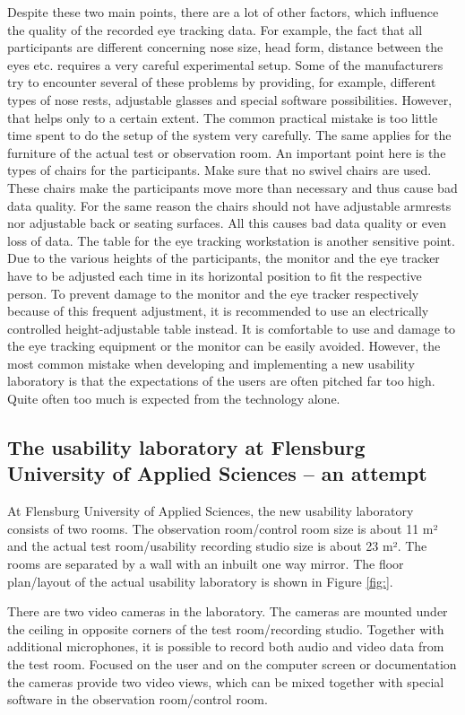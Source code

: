 \documentclass[output=paper]{langsci/langscibook}
\begin{document}
Despite these two main points, there are a lot of other factors, which influence the quality of the recorded eye tracking data. For example, the fact that all participants are different concerning nose size, head form, distance between the eyes etc. requires a very careful experimental setup. Some of the manufacturers try to encounter several of these problems by providing, for example, different types of nose rests, adjustable glasses and special software possibilities. However, that helps only to a certain extent. The common practical mistake is too little time spent to do the setup of the system very carefully. The same applies for the furniture of the actual test or observation room. An important point here is the types of chairs for the participants. Make sure that no swivel chairs are used. These chairs make the participants move more than necessary and thus cause bad data quality. For the same reason the chairs should not have adjustable armrests nor adjustable back or seating surfaces. All this causes bad data quality or even loss of data. The table for the eye tracking workstation is another sensitive point. Due to the various heights of the participants, the monitor and the eye tracker have to be adjusted each time in its horizontal position to fit the respective person. To prevent damage to the monitor and the eye tracker respectively because of this frequent adjustment, it is recommended to use an electrically controlled height-adjustable table instead. It is comfortable to use and damage to the eye tracking equipment or the monitor can be easily avoided. However, the most common mistake when developing and implementing a new usability laboratory is that the expectations of the users are often pitched far too high. Quite often too much is expected from the technology alone. 


\subsection{The usability laboratory at Flensburg University of Applied Sciences – an attempt }

At Flensburg University of Applied Sciences, the new usability laboratory consists of two rooms. The observation room/control room size is about 11 m² and the actual test room/usability recording studio size is about 23 m². The rooms are separated by a wall with an inbuilt one way mirror. The floor plan/layout of the actual usability laboratory is shown in Figure \ref{fig:}. 


There are two video cameras in the laboratory. The cameras are mounted under the ceiling in opposite corners of the test room/recording studio. Together with additional microphones, it is possible to record both audio and video data from the test room. Focused on the user and on the computer screen or documentation the cameras provide two video views, which can be mixed together with special software in the observation room/control room. 
\end{document}
